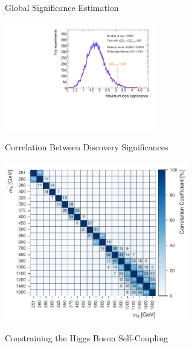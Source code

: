 \documentclass[11pt, xcolor={dvipsnames}, aspectratio=169, notes]{beamer}
\begin{document}

\begin{frame}{Global Significance Estimation}
  \centering

  \includegraphics[width=0.5\textwidth]{global_significance/zmax_toys}
\end{frame}


\begin{frame}{Correlation Between Discovery Significances}
  \centering

  \includegraphics[width=0.6\textwidth]{global_significance/sig_corr}

\end{frame}


\begin{frame}[standout]
  Constraining the Higgs Boson Self-Coupling
\end{frame}

\end{document}
